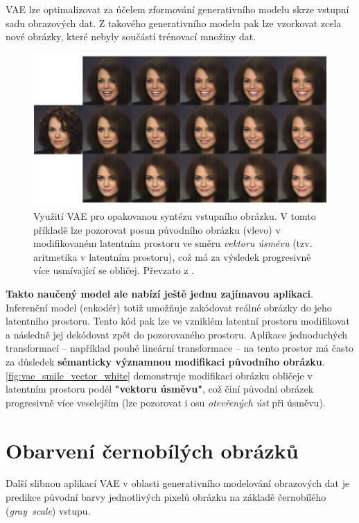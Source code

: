 VAE lze optimalizovat za účelem zformování generativního modelu skrze vstupní sadu obrazových dat.
Z takového generativního modelu pak lze vzorkovat zcela nové obrázky, které nebyly součástí trénovací množiny dat. \cite{Kingma2019}

\begin{figure}[H]
    \centering
    \includegraphics[width=\textwidth]{figures/applications/vae_smile_vector_white.png}
    \caption{Využití VAE pro opakovanou syntézu vstupního obrázku. V tomto příkladě lze pozorovat posun původního obrázku (vlevo) v modifikovaném latentním prostoru ve směru \emph{vektoru úsměvu} (tzv. aritmetika v latentním prostoru), což má za výsledek progresivně více usmívající se obličej. Převzato z \textcite{White2016}.}
    \label{fig:vae_smile_vector_white}
\end{figure}


\textbf{Takto naučený model ale nabízí ještě jednu zajímavou aplikaci}.
Inferenční model (enkodér) totiž umožňuje zakódovat reálné obrázky do jeho latentního prostoru.
Tento kód pak lze ve vzniklém latentní prostoru modifikovat a následně jej dekódovat zpět do pozorovaného prostoru.
Aplikace jednoduchých transformací – například pouhé lineární transformace – na tento prostor má často za důsledek \textbf{sémanticky významnou modifikaci původního obrázku}.
\autoref{fig:vae_smile_vector_white} demonstruje modifikaci obrázku obličeje v latentním prostoru podél \textbf{"vektoru úsměvu"}, což činí původní obrázek progresivně více veselejším (lze pozorovat i osu \emph{otevřených úst} při úsměvu). \cite{Kingma2019}

\newpage
\section{Obarvení černobílých obrázků}
\label{sec:applications_image_coloring}
Další slibnou aplikací VAE v oblasti generativního modelování obrazových dat je predikce původní barvy jednotlivých pixelů obrázku na základě černobílého (\emph{gray~scale}) vstupu.

